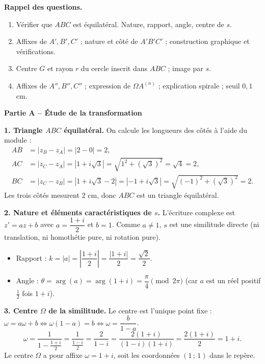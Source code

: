 \documentclass[11pt]{article}
\newcommand{\cle}[1]{{\popxbold\color{popdark}#1}}
\begin{document}
\begin{exoresolu}
\textbf{Rappel des questions.}
\begin{enumerate}
\item Vérifier que $ABC$ est équilatéral. Nature, rapport, angle, centre de $s$.
\item Affixes de $A', B', C'$ ; nature et côté de $A'B'C'$ ; construction graphique et vérifications.
\item Centre $G$ et rayon $r$ du cercle inscrit dans $ABC$ ; image par $s$.
\item Affixes de $A'', B'', C''$ ; expression de $\Omega A^{(n)}$ ; explication spirale ; seuil $0,1$ cm.
\end{enumerate}
\tcblower
\textbf{Partie A -- Étude de la transformation}

\textbf{1. Triangle $ABC$ équilatéral.}
On calcule les longueurs des côtés à l'aide du module :
\begin{align*}
AB &= |z_B - z_A| = |2 - 0| = 2,\\
AC &= |z_C - z_A| = |1 + i\sqrt{3}| = \sqrt{1^2 + (\sqrt{3})^2} = \sqrt{4} = 2,\\
BC &= |z_C - z_B| = |1 + i\sqrt{3} - 2| = |-1 + i\sqrt{3}| = \sqrt{(-1)^2 + (\sqrt{3})^2} = 2.
\end{align*}
Les trois côtés mesurent $2$ cm, donc $ABC$ est un triangle équilatéral.

\textbf{2. Nature et éléments caractéristiques de $s$.}
L'écriture complexe est $z' = a z + b$ avec $a = \dfrac{1+i}{2}$ et $b = 1$.
Comme $a \neq 1$, $s$ est une \cle{similitude directe} (ni translation, ni homothétie pure, ni rotation pure).
\begin{itemize}
\item \cle{Rapport} : $k = |a| = \left|\dfrac{1+i}{2}\right| = \dfrac{|1+i|}{2} = \dfrac{\sqrt{2}}{2}$.
\item \cle{Angle} : $\theta = \arg(a) = \arg(1+i) = \dfrac{\pi}{4} \pmod{2\pi}$ (car $a$ est un réel positif $\frac{1}{2}$ fois $1+i$).
\end{itemize}

\textbf{3. Centre $\Omega$ de la similitude.}
Le centre est l'unique point fixe : $\omega = a\omega + b \iff \omega(1-a) = b \iff \omega = \dfrac{b}{1-a}$.
\[
\omega = \frac{1}{1 - \frac{1+i}{2}} = \frac{1}{\frac{1-i}{2}} = \frac{2}{1-i} = \frac{2(1+i)}{(1-i)(1+i)} = \frac{2(1+i)}{2} = 1+i.
\]
Le centre $\Omega$ a pour affixe $\omega = 1+i$, soit les coordonnées $(1\,;\,1)$ dans le repère.


\end{exoresolu}
\end{document}
